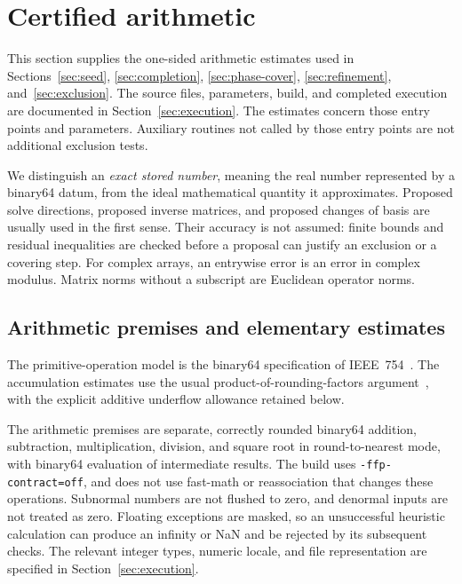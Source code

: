\section{Certified arithmetic}\label{sec:rounding}

This section supplies the one-sided arithmetic estimates used in
Sections~\ref{sec:seed}, \ref{sec:completion}, \ref{sec:phase-cover},
\ref{sec:refinement}, and~\ref{sec:exclusion}.
The source files, parameters, build, and completed execution are
documented in Section~\ref{sec:execution}.  The estimates concern those entry points
and parameters.  Auxiliary routines not called by those entry points are
not additional exclusion tests.

We distinguish an \emph{exact stored number}, meaning the real number
represented by a binary64 datum, from the ideal mathematical quantity it
approximates.  Proposed solve directions, proposed inverse matrices, and
proposed changes of basis are usually used in the first sense.  Their
accuracy is not assumed: finite bounds and residual inequalities are
checked before a proposal can justify an exclusion or a covering step.
For complex arrays, an entrywise error is an error in complex modulus.
Matrix norms without a subscript are Euclidean operator norms.

\subsection{Arithmetic premises and elementary estimates}
\label{round:premises}

The primitive-operation model is the binary64 specification of
IEEE~754~\cite[Sections~3.4, 3.6, 4.3, 5.4.1 and~7.5]{IEEE7542019}.
The accumulation estimates use the usual product-of-rounding-factors
argument~\cite[Section~2.12 and Lemma~3.1]{Higham2002Accuracy}, with the
explicit additive underflow allowance retained below.

The arithmetic premises are separate, correctly rounded binary64
addition, subtraction, multiplication, division, and square root in
round-to-nearest mode, with binary64 evaluation of intermediate results.
The build uses \texttt{-ffp-contract=off}, and does not use fast-math or
reassociation that changes these operations.  Subnormal numbers are not
flushed to zero, and denormal inputs are not treated as zero.  Floating
exceptions are masked, so an unsuccessful heuristic calculation can
produce an infinity or NaN and be rejected by its subsequent checks.
The relevant integer types, numeric locale, and file representation are
specified in Section~\ref{sec:execution}.

